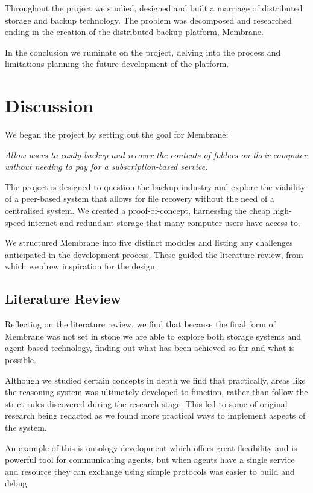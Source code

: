 \documentclass[11pt, a4paper, twoside]{report}
\begin{document}
Throughout the project we studied, designed and built a marriage of distributed storage and backup technology. The problem was decomposed and researched ending in the creation of the distributed backup platform, Membrane.

In the conclusion we ruminate on the project, delving into the process and limitations planning the future development of the platform.

\section{Discussion}

We began the project by setting out the goal for Membrane:

\begin{displayquote}
 \emph{Allow users to easily backup and recover the contents of folders on their computer without needing to pay for a subscription-based service.}
\end{displayquote}

The project is designed to question the backup industry and explore the viability of a peer-based system that allows for file recovery without the need of a centralised system. We created a proof-of-concept, harnessing the cheap high-speed internet and redundant storage that many computer users have access to.

We structured Membrane into five distinct modules and listing any challenges anticipated in the development process. These guided the literature review, from which we drew inspiration for the design.

\subsection{Literature Review}

Reflecting on the literature review, we find that because the final form of Membrane was not set in stone we are able to explore both storage systems and agent based technology, finding out what has been achieved so far and what is possible.

Although we studied certain concepts in depth we find that practically, areas like the reasoning system was ultimately developed to function, rather than follow the strict rules discovered during the research stage. This led to some of original research being redacted as we found more practical ways to implement aspects of the system.

An example of this is ontology development which offers great flexibility and is powerful tool for communicating agents, but when agents have a single service and resource they can exchange using simple protocols was easier to build and debug.
\end{document}
